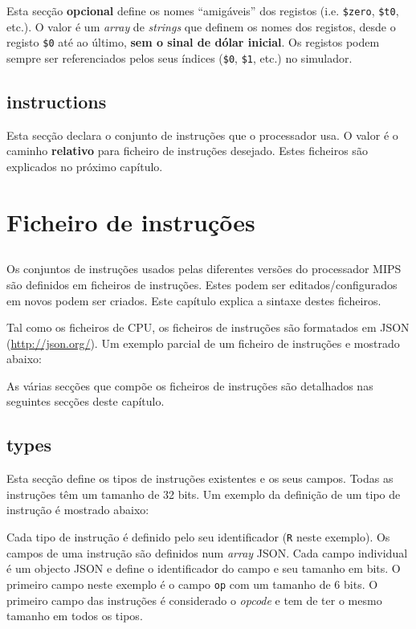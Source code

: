\documentclass[11pt,a4paper,twoside,titlepage]{report}
\begin{document}
Esta secção \textbf{opcional} define os nomes ``amigáveis'' dos registos (i.e.
\verb+$zero+, \verb+$t0+, etc.).
O valor é um \emph{array} de \emph{strings} que definem os nomes dos registos,
desde o registo \verb+$0+ até ao último, \textbf{sem o sinal de dólar inicial}.
Os registos podem sempre ser referenciados pelos seus índices (\verb+$0+,
\verb+$1+, etc.) no simulador.


\section{instructions}

Esta secção declara o conjunto de instruções que o processador usa.
O valor é o caminho \textbf{relativo} para ficheiro de instruções desejado.
Estes ficheiros são explicados no próximo capítulo.


\chapter{Ficheiro de instruções}

\section*{}

Os conjuntos de instruções usados pelas diferentes versões do processador MIPS
são definidos em ficheiros de instruções.
Estes podem ser editados/configurados em novos podem ser criados.
Este capítulo explica a sintaxe destes ficheiros.

Tal como os ficheiros de CPU, os ficheiros de instruções são formatados em
JSON (\url{http://json.org/}).
Um exemplo parcial de um ficheiro de instruções e mostrado abaixo:



As várias secções que compõe os ficheiros de instruções são detalhados nas
seguintes secções deste capítulo.


\section{types}

Esta secção define os tipos de instruções existentes e os seus campos.
Todas as instruções têm um tamanho de 32 bits.
Um exemplo da definição de um tipo de instrução é mostrado abaixo:



Cada tipo de instrução é definido pelo seu identificador (\verb+R+ neste exemplo).
Os campos de uma instrução são definidos num \emph{array} JSON. Cada campo
individual é um objecto JSON e define o identificador do campo e seu tamanho em
bits. O primeiro campo neste exemplo é o campo \verb+op+ com um tamanho de 6 bits.
O primeiro campo das instruções é considerado o \emph{opcode} e tem de ter o
mesmo tamanho em todos os tipos.
\end{document}
